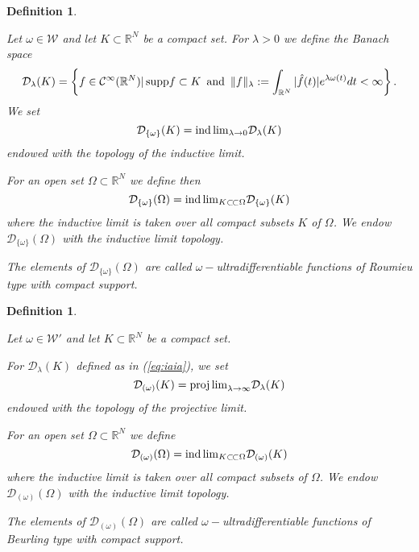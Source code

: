 \documentclass[twoside]{amsart}
\newtheorem{Def}[Th]{Definition}
\begin{document}
\begin{Def}
\begin{em}
Let $\omega\in{\mathcal{W}}$ and let $K\subset\mathbb{R}^{N}$ be a compact
set.
For $\lambda>0$ we define the Banach space
\begin{equation}
{\mathcal{D}}_{\lambda}(K)=\left\{ f\in\mathcal C^{\infty}(\mathbb{R}^{N})|\,
{\mathop{\rm supp}\nolimits} f\subset K\,\,\,\mbox{and}\,\,\,\|f\|_{\lambda}:=
\int_{\mathbb{R}^{N}}|\hat{f}(t)|e^{\lambda\omega(t)}dt<\infty\right\} .
\label{eq:iaia}
\end{equation}
We set
\[
{\mathcal{D}}_{\{\omega\}}(K)={\mathop{\rm ind\,lim}}_{\lambda\to0}{\mathcal{D}}_{\lambda}(K)
\]
endowed with the topology of the inductive limit.

For an open set $\Omega\subset\mathbb{R}^{N}$ we define then
\[
{\mathcal{D}}_{\{\omega\}}(\Omega)={\mathop{\rm ind\,lim}}_{K\subset\!\subset\Omega}{\mathcal{D}}_{\{\omega\}}(K)
\]
where the inductive limit is taken over all compact subsets $K$ of
$\Omega$. We endow ${\mathcal{D}}_{\{\omega\}}(\Omega)$ with the inductive limit topology.

The elements of ${\mathcal{D}}_{\{\omega\}}(\Omega)$ are called 
\emph{$\omega-$ultradifferentiable functions of Roumieu type
with compact support.}
\end{em}
\end{Def}

\begin{Def}
\begin{em}
Let $\omega\in{\mathcal{W}}'$ and let $K\subset\mathbb{R}^{N}$ be a compact
set.

For ${\mathcal{D}}_{\lambda}(K)$ defined as in (\ref{eq:iaia}), we set
\[
{\mathcal{D}}_{(\omega)}(K)={\mathop{\rm proj\,lim}}_{\lambda\rightarrow\infty}{\mathcal{D}}_{\lambda}(K)
\]
endowed with the topology of the projective limit.

For an open set $\Omega\subset\mathbb{R}^{N}$ we define
\[
{\mathcal{D}}_{(\omega)}(\Omega)={\mathop{\rm ind\,lim}}_{K\subset\!\subset\Omega}{\mathcal{D}}_{(\omega)}(K)
\]
where the inductive limit is taken over all compact subsets of $\Omega$.
We endow
${\mathcal{D}}_{(\omega)}(\Omega)$ with the inductive limit topology.

The elements of ${\mathcal{D}}_{(\omega)}(\Omega)$ are called
\emph{$\omega-$ultradifferentiable functions of Beurling
type with compact support.}
\end{em}
\end{Def}
\end{document}
